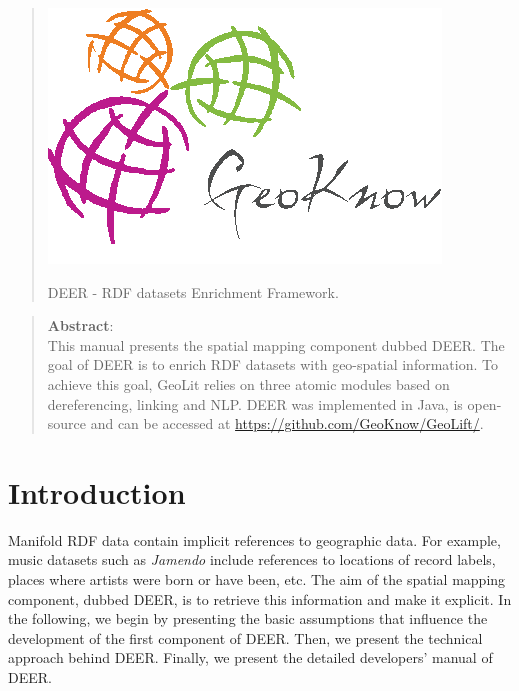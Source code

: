 \documentclass[a4paper,twoside,bibtotoc,abstracton,12pt,BCOR=15mm]{article}
\newcommand{\geolift}{\textsc{DEER}\xspace}
\begin{document}


\vspace*{\fill} 
\begin{quote} 
\centering 
\begin{center}
 \includegraphics[scale=0.5]{images/geoknow.png}
\end{center}
\begin{flushleft}
 \Large{\geolift}
 \small{ - RDF datasets Enrichment Framework.}
\end{flushleft}
\end{quote}
\vspace*{\fill}
\newpage

\vspace*{\fill} 
\begin{quote} 

\textbf{Abstract}: \\
This manual presents the spatial mapping component dubbed \geolift. 
The goal of \geolift is to enrich RDF datasets with geo-spatial information. 
To achieve this goal, GeoLit relies on three atomic modules based on dereferencing, linking and NLP. 
\geolift was implemented in Java, is open-source and can be accessed at \url{https://github.com/GeoKnow/GeoLift/}. 
\end{quote}
\vspace*{\fill}

\newpage
\tableofcontents
\newpage

\section{Introduction}
Manifold RDF data contain implicit references to geographic data.
For example, music datasets such as \emph{Jamendo} include references to locations of record labels, places where artists were born or have been, etc.
The aim of the spatial mapping component, dubbed \geolift, is to retrieve this information and make it explicit.
In the following, we begin by presenting the basic assumptions that influence the development of the first component of \geolift.
Then, we present the technical approach behind \geolift.
Finally, we present the detailed developers' manual of \geolift.
\end{document}
